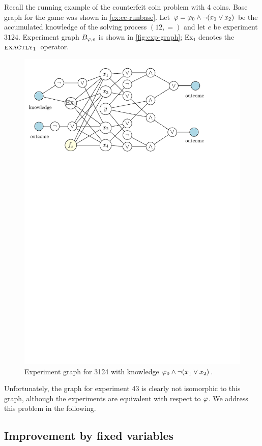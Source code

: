 \begin{example}
Recall the running example of the counterfeit coin problem with 4 coins.
Base graph for the game was shown in \autoref{ex:cc-runbase}.
Let $\varphi=\varphi_0\wedge\neg(x_1\vee x_2)$ be the accumulated knowledge
  of the solving process $(12, =)$ and let $e$ be experiment $3124$.
Experiment graph $B_{\varphi, e}$ is shown in \autoref{fig:exp-graph};
  Ex$_1$ denotes the $\textsc{exactly}_{1}\:$ operator.
\begin{figure}[ht]
\begin{center}
\includegraphics[width=.7\textwidth]{pictures/exp-graph.pdf}
\caption{Experiment graph for 3124 with knowledge $\varphi_0\wedge\neg(x_1\vee x_2)$.}
\label{fig:exp-graph}
\end{center}
\end{figure}

Unfortunately, the graph for experiment 43 is clearly not isomorphic to this graph,
although the experiments are equivalent with respect to $\varphi$.
We address this problem in the following.\eqed
\end{example}

\subsection{Improvement by fixed variables}

